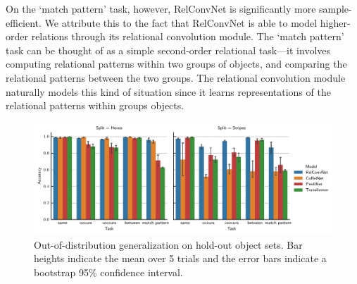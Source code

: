 On the `match pattern' task, however, RelConvNet is significantly more sample-efficient. We attribute this to the fact that RelConvNet is able to model higher-order relations through its relational convolution module. The `match pattern' task can be thought of as a simple second-order relational task---it involves computing relational patterns within two groups of objects, and comparing the relational patterns between the two groups. The relational convolution module naturally models this kind of situation since it learns representations of the relational patterns within groups objects. %
\begin{figure}[ht]
    \vskip-15pt
    \centering
    \includegraphics[width=\textwidth]{figs/experiments/relgames_ood_acc.pdf}
    \vskip-5pt
    \caption{Out-of-distribution generalization on hold-out object sets. Bar heights indicate the mean over 5 trials and the error bars indicate a bootstrap 95\% confidence interval.}\label{fig:ood_generalization}
    \vskip-15pt
\end{figure}


